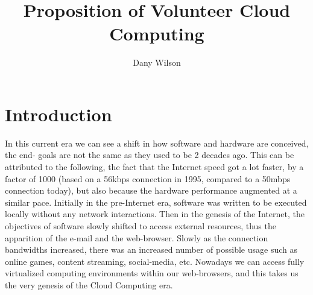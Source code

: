 \documentclass[11pt]{amsart}
\title{Proposition of Volunteer Cloud Computing}
\author{Dany Wilson}
\begin{document}
\maketitle
        \section{Introduction}
	In this current era we can see a shift in how software and hardware are conceived, the end-
	goals are not the same as they used to be 2 decades ago. This can be attributed to the 
	following, the fact that the Internet speed got a lot faster, by a factor of 1000 (based on
	a 56kbps connection in 1995, compared to a 50mbps connection today), but also because the 
	hardware performance augmented at a similar pace. Initially in the pre-Internet era, 
	software was written to be executed locally without any network interactions. Then in the 
	genesis of the Internet, the objectives of software slowly shifted to access external 
	resources, thus the apparition of the e-mail and the web-browser. Slowly as the connection
	bandwidths increased, there was an increased number of possible usage such as online games, 
	content streaming, social-media, etc. Nowadays we can access fully virtualized computing
	environments within our web-browsers, and this takes us the very genesis of the Cloud 
	Computing era. 
\end{document}
